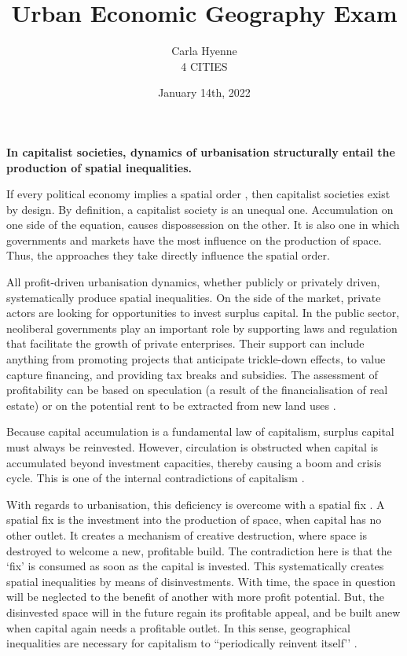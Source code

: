 \documentclass[12pt]{article}
\title{Urban Economic Geography Exam}
\author{Carla Hyenne\\[3ex]4 CITIES}
\date{January 14th, 2022}
\begin{document}
\maketitle

\pagebreak
\singlespacing

\textbf{In capitalist societies, dynamics of urbanisation structurally entail the production of spatial inequalities.}

If every political economy implies a spatial order \parencite{lefebvre2009state}, then capitalist societies exist by design. 
By definition, a capitalist society is an unequal one. Accumulation on one side of the equation, causes dispossession on the other.
It is also one in which governments and markets have the most influence on the production of space. Thus, the approaches they take directly influence the spatial order.

All profit-driven urbanisation dynamics, whether publicly or privately driven, systematically produce spatial inequalities. 
On the side of the market, private actors are looking for opportunities to invest surplus capital. In the public sector, neoliberal governments play an important role by supporting laws and regulation that facilitate the growth of private enterprises. Their support can include anything from promoting projects that anticipate trickle-down effects, to value capture financing, and providing tax breaks and subsidies.
The assessment of profitability can be based on speculation (a result of the financialisation of real estate) or on the potential rent to be extracted from new land uses \parencite{smith1979toward}.

Because capital accumulation is a fundamental law of capitalism, surplus capital must always be reinvested. However, circulation is obstructed when capital is accumulated beyond investment capacities, thereby causing a boom and crisis cycle. This is one of the internal contradictions of capitalism \parencite{harvey2014seventeen}.

With regards to urbanisation, this deficiency is overcome with a spatial fix \parencite{harvey2001globalization}.
A spatial fix is the investment into the production of space, when capital has no other outlet. 
It creates a mechanism of creative destruction, where space is destroyed to welcome a new, profitable build.
The contradiction here is that the `fix' is consumed as soon as the capital is invested. This systematically creates spatial inequalities by means of disinvestments. With time, the space in question will be neglected to the benefit of another with more profit potential. But, the disinvested space will in the future regain its profitable appeal, and be built anew when capital again needs a profitable outlet.
In this sense, geographical inequalities are necessary for capitalism to ``periodically reinvent itself’’ \parencite[p.157]{harvey2014seventeen}.
\end{document}

